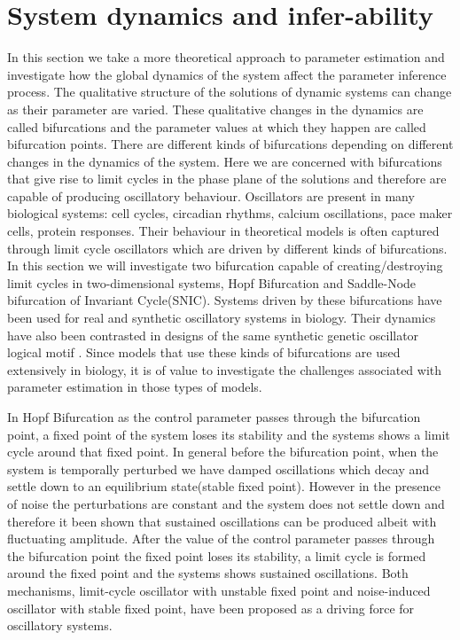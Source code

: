 \chapter{System dynamics and infer-ability}
\ifpdf
    \graphicspath{{Chapter3/Chapter3Figs/PNG/}{Chapter3/Chapter3Figs/PDF/}{Chapter3/Chapter3Figs/}}
\else
    \graphicspath{{Chapter3/Chapter3Figs/EPS/}{Chapter3/Chapter3Figs/}}
\fi

In this section we take a more theoretical approach to parameter estimation and investigate how the global dynamics of the system affect the parameter inference process. The qualitative structure of the solutions of dynamic systems can change as their parameter are varied. These qualitative changes in the dynamics are called bifurcations and the parameter values at which they happen are called bifurcation points. There are different kinds of bifurcations depending on different changes in the dynamics of the system. Here we are concerned with bifurcations that give rise to limit cycles in the phase plane of the solutions and therefore are capable of producing oscillatory behaviour.  Oscillators are present in many biological systems: cell cycles, circadian rhythms, calcium oscillations, pace maker cells, protein responses. Their behaviour in theoretical models is often captured through limit cycle oscillators which are driven by different kinds of bifurcations. In this section we will investigate two bifurcation capable of creating/destroying limit cycles in two-dimensional systems, Hopf Bifurcation and Saddle-Node bifurcation of Invariant Cycle(SNIC). Systems driven by these bifurcations have been used for real and synthetic oscillatory systems in biology. Their dynamics have also been contrasted in designs of the same synthetic genetic oscillator logical motif \cite[] {guantes2006dynamical}.  Since models that use these kinds of bifurcations are used extensively in biology, it is of value to investigate the challenges associated with parameter estimation in those types of models.

In Hopf Bifurcation as the control parameter passes through the bifurcation point, a fixed point of the system loses its stability and the systems shows a limit cycle around that fixed point. In general before the bifurcation point, when the system is temporally perturbed we have damped oscillations which decay and settle down to an equilibrium state(stable fixed point). However in the presence of noise the perturbations are constant and the system does not settle down and therefore it been shown that sustained oscillations can be produced albeit with fluctuating amplitude. After the value of the control parameter passes through the bifurcation point the fixed point loses its stability, a limit cycle is formed around the fixed point and the systems shows sustained oscillations.  Both mechanisms, limit-cycle oscillator with unstable fixed point and noise-induced oscillator with stable fixed point, have been proposed as a driving force for oscillatory systems.

